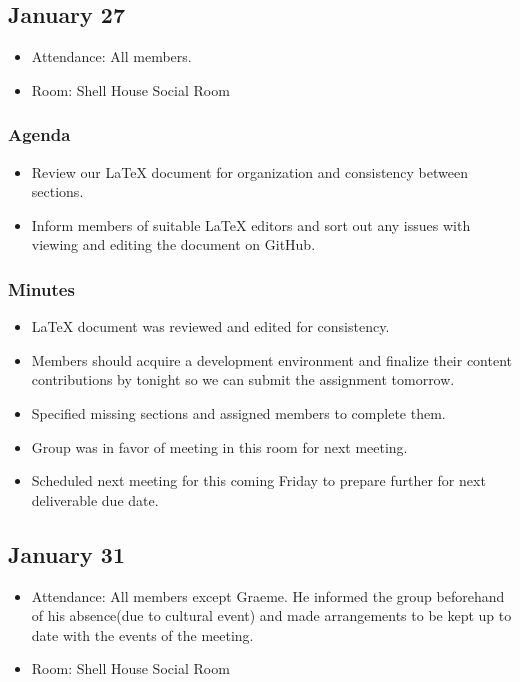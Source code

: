 \documentclass{article}
\begin{document}
\subsection{January 27}
\begin{itemize}
\item Attendance: All members.
\item Room: Shell House Social Room
\end{itemize}
\subsubsection{Agenda}
\begin{itemize}
\item Review our LaTeX document for organization and consistency between
 sections.
\item Inform members of suitable LaTeX editors and sort out any issues with
 viewing and editing the document on GitHub.
\end{itemize}
\subsubsection{Minutes}
\begin{itemize}
\item LaTeX document was reviewed and edited for consistency.
\item Members should acquire a development environment and finalize their 
content contributions by tonight so we can submit the assignment tomorrow.
\item Specified missing sections and assigned members to complete them.
\item Group was in favor of meeting in this room for next meeting.
\item Scheduled next meeting for this coming Friday to prepare further
 for next deliverable due date.
\end{itemize}

\subsection{January 31}
\begin{itemize}
\item Attendance: All members except Graeme.  He informed the group 
beforehand of his absence(due to cultural event) and made arrangements to 
be kept up to date with the events of the meeting.
\item Room: Shell House Social Room
\end{itemize}
\end{document}
